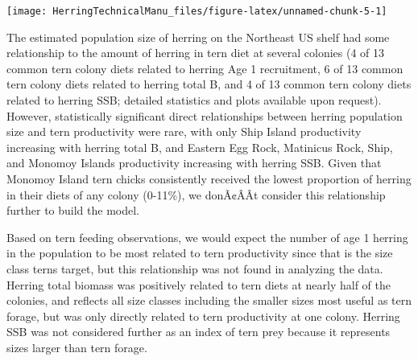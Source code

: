 \documentclass[]{article}
\let\origfigure\figure
\let\endorigfigure\endfigure
\renewenvironment{figure}[1][2] {
    \expandafter\origfigure\expandafter[H]
} {
    \endorigfigure
}
\begin{document}
\begin{figure}

{\centering \texttt{[image: HerringTechnicalManu\_files/figure-latex/unnamed-chunk-5-1]} 

}

\caption{Herring proporiton in diet and tern productivity by colony \label{proddiet}}\label{fig:unnamed-chunk-5}
\end{figure}

The estimated population size of herring on the Northeast US shelf had
some relationship to the amount of herring in tern diet at several
colonies (4 of 13 common tern colony diets related to herring Age 1
recruitment, 6 of 13 common tern colony diets related to herring total
B, and 4 of 13 common tern colony diets related to herring SSB; detailed
statistics and plots available upon request). However, statistically
significant direct relationships between herring population size and
tern productivity were rare, with only Ship Island productivity
increasing with herring total B, and Eastern Egg Rock, Matinicus Rock,
Ship, and Monomoy Islands productivity increasing with herring SSB.
Given that Monomoy Island tern chicks consistently received the lowest
proportion of herring in their diets of any colony (0-11\%), we
donÃ¢ÂÂt consider this relationship further to build the model.

Based on tern feeding observations, we would expect the number of age 1
herring in the population to be most related to tern productivity since
that is the size class terns target, but this relationship was not found
in analyzing the data. Herring total biomass was positively related to
tern diets at nearly half of the colonies, and reflects all size classes
including the smaller sizes most useful as tern forage, but was only
directly related to tern productivity at one colony. Herring SSB was not
considered further as an index of tern prey because it represents sizes
larger than tern forage.
\end{document}
